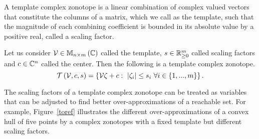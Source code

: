 A template complex zonotope is a linear combination of complex valued
vectors that constitute the columns of a matrix, which we call as the
template, such that the magnitude of each combining coefficient is
bounded in its absolute value by a positive real, called a scaling factor.
%
\begin{definition}
Let us consider $\mathcal{V}\in\mathbb{M}_{n\times m}\left(\mathbb{C}\right)$ called the template,
$s\in\mathbb{R}^m_{\geq 0}$ called scaling factors and
$c\in\mathbb{C}^n$ called the center.  Then the following is a template
complex zonotope.
%
\begin{equation}
\mathit{\operatorname{\mathcal{T}}}\left(\mathcal{V},c,s\right)
= \left\{\mathcal{V}\zeta+c:~\left|\zeta_i\right|\leq s_i~\forall
i\in\left\{1,...,m\right\}\right\}.
\end{equation}
\end{definition}
%
The scaling factors of a template complex zonotope can be treated as
variables that can be adjusted to find better over-approximations of a
reachable set.  For example, Figure~\ref{toref} illustrates the
different over-approximations of a convex hull of five points by a
complex zonotopes with a fixed template but different scaling factors.

